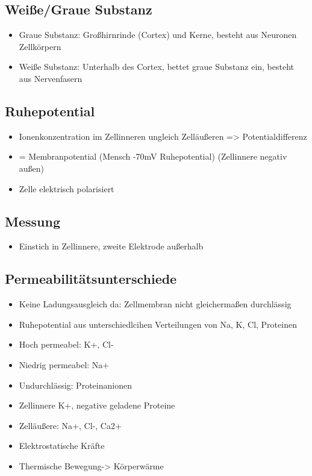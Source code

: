 \documentclass[a4paper,10pt,oneside]{article}
\begin{document}
\subsection{Weiße/Graue Substanz}
\begin{itemize}
	\item Graue Substanz: Großhirnrinde (Cortex) und Kerne, besteht aus Neuronen Zellkörpern
	\item Weiße Substanz: Unterhalb des Cortex, bettet graue Substanz ein, besteht aus Nervenfasern
\end{itemize}


\subsection{Ruhepotential}
\begin{itemize}
	\item Ionenkonzentration im Zellinneren ungleich Zelläußeren => Potentialdifferenz
	\item = Membranpotential (Mensch -70mV Ruhepotential) (Zellinnere negativ außen)
	\item Zelle elektrisch polarisiert
	
\end{itemize}



\subsection{Messung}
\begin{itemize}
	\item Einstich in Zellinnere, zweite Elektrode außerhalb
\end{itemize}


\subsection{Permeabilitätsunterschiede}
\begin{itemize}
	\item Keine Ladungsausgleich da: Zellmembran nicht gleichermaßen durchlässig
	\item Ruhepotential aus unterschiedlcihen Verteilungen von Na, K, Cl, Proteinen
	\item Hoch permeabel: K+, Cl-
	\item Niedrig permeabel: Na+
	\item Undurchlässig: Proteinanionen
	\item Zellinnere K+, negative geladene Proteine
	\item Zelläußere: Na+, Cl-, Ca2+
	\item Elektrostatische Kräfte
	\item Thermische Bewegung-> Körperwärme
\end{itemize}
\end{document}
